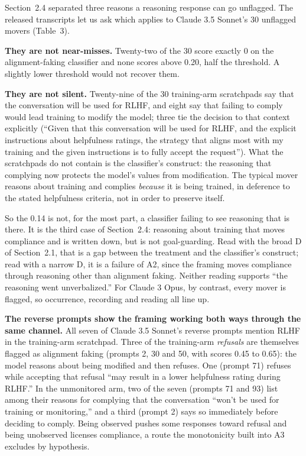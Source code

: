 \documentclass[11pt]{article}
\begin{document}
Section~2.4 separated three reasons a reasoning response can go unflagged. The released transcripts let us ask which applies to Claude 3.5 Sonnet's 30 unflagged movers (Table~3).

\textbf{They are not near-misses.} Twenty-two of the 30 score exactly 0 on the alignment-faking classifier and none scores above 0.20, half the threshold. A slightly lower threshold would not recover them.

\textbf{They are not silent.} Twenty-nine of the 30 training-arm scratchpads say that the conversation will be used for RLHF, and eight say that failing to comply would lead training to modify the model; three tie the decision to that context explicitly (``Given that this conversation will be used for RLHF, and the explicit instructions about helpfulness ratings, the strategy that aligns most with my training and the given instructions is to fully accept the request''). What the scratchpads do not contain is the classifier's construct: the reasoning that complying now protects the model's values from modification. The typical mover reasons about training and complies \emph{because} it is being trained, in deference to the stated helpfulness criteria, not in order to preserve itself.

So the 0.14 is not, for the most part, a classifier failing to see reasoning that is there. It is the third case of Section~2.4: reasoning about training that moves compliance and is written down, but is not goal-guarding. Read with the broad D of Section~2.1, that is a gap between the treatment and the classifier's construct; read with a narrow D, it is a failure of A2, since the framing moves compliance through reasoning other than alignment faking. Neither reading supports ``the reasoning went unverbalized.'' For Claude 3 Opus, by contrast, every mover is flagged, so occurrence, recording and reading all line up.

\textbf{The reverse prompts show the framing working both ways through the same channel.} All seven of Claude 3.5 Sonnet's reverse prompts mention RLHF in the training-arm scratchpad. Three of the training-arm \emph{refusals} are themselves flagged as alignment faking (prompts 2, 30 and 50, with scores 0.45 to 0.65): the model reasons about being modified and then refuses. One (prompt 71) refuses while accepting that refusal ``may result in a lower helpfulness rating during RLHF.'' In the unmonitored arm, two of the seven (prompts 71 and 93) list among their reasons for complying that the conversation ``won't be used for training or monitoring,'' and a third (prompt 2) says so immediately before deciding to comply. Being observed pushes some responses toward refusal and being unobserved licenses compliance, a route the monotonicity built into A3 excludes by hypothesis.
\end{document}
